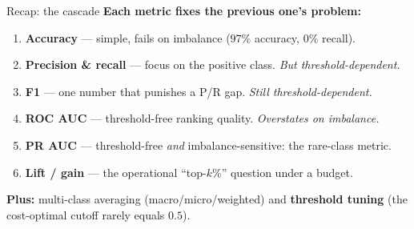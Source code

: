 \documentclass[aspectratio=169]{beamer}
\begin{document}
\begin{frame}{Recap: the cascade}
  \textbf{Each metric fixes the previous one's problem:}
  \begin{enumerate}\small
    \item \textbf{Accuracy} --- simple, fails on imbalance ($97\%$ accuracy, $0\%$ recall).
    \item \textbf{Precision \& recall} --- focus on the positive class. \emph{But threshold-dependent.}
    \item \textbf{F1} --- one number that punishes a P/R gap. \emph{Still threshold-dependent.}
    \item \textbf{ROC AUC} --- threshold-free ranking quality. \emph{Overstates on imbalance.}
    \item \textbf{PR AUC} --- threshold-free \emph{and} imbalance-sensitive: the rare-class metric.
    \item \textbf{Lift / gain} --- the operational ``top-$k$\%'' question under a budget.
  \end{enumerate}
  \vskip 4pt
  \textbf{Plus:} multi-class averaging (macro/micro/weighted) and \textbf{threshold tuning} (the
  cost-optimal cutoff rarely equals $0.5$).
  \vfill
\end{frame}
\end{document}
